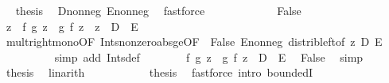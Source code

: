\begin{isabellebody}
\ \isamarkupfalse%
\ {\isacharquery}{\kern0pt}thesis\ \isamarkupfalse%
\ D{\isacharunderscore}{\kern0pt}nonneg\ E{\isacharunderscore}{\kern0pt}nonneg\ \isamarkupfalse%
\ fastforce\isanewline
\ \ \ \ \isamarkupfalse%
\isanewline
\ \ \ \ \ \ \isamarkupfalse%
\ False\isanewline
\ \ \ \ \ \ \isamarkupfalse%
\ {\isachardoublequoteopen}{\isasymbar}z{\isasymbar}\ {\isacharasterisk}{\kern0pt}\ {\isasymbar}f\ {\isacharparenleft}{\kern0pt}g\ z{\isacharparenright}{\kern0pt}\ {\isacharminus}{\kern0pt}\ g\ {\isacharparenleft}{\kern0pt}f\ z{\isacharparenright}{\kern0pt}{\isasymbar}\ {\isasymle}\ {\isasymbar}z{\isasymbar}\ {\isacharasterisk}{\kern0pt}\ {\isacharparenleft}{\kern0pt}D\ {\isacharplus}{\kern0pt}\ E{\isacharparenright}{\kern0pt}{\isachardoublequoteclose}\ \isanewline
\ \ \ \ \ \ \ \ \isamarkupfalse%
\ mult{\isacharunderscore}{\kern0pt}right{\isacharunderscore}{\kern0pt}mono{\isacharbrackleft}{\kern0pt}OF\ Ints{\isacharunderscore}{\kern0pt}nonzero{\isacharunderscore}{\kern0pt}abs{\isacharunderscore}{\kern0pt}ge{}{\isacharbrackleft}{\kern0pt}OF\ {\isacharunderscore}{\kern0pt}\ False{\isacharbrackright}{\kern0pt}\ E{\isacharunderscore}{\kern0pt}nonneg{\isacharbrackright}{\kern0pt}\ distrib{\isacharunderscore}{\kern0pt}left{\isacharbrackleft}{\kern0pt}of\ {\isachardoublequoteopen}{\isasymbar}z{\isasymbar}{\isachardoublequoteclose}\ D\ E{\isacharbrackright}{\kern0pt}\ {\isacharasterisk}{\kern0pt}\isanewline
\ \ \ \ \ \ \ \ \isamarkupfalse%
\ {\isacharparenleft}{\kern0pt}simp\ add{\isacharcolon}{\kern0pt}\ Ints{\isacharunderscore}{\kern0pt}def{\isacharparenright}{\kern0pt}\isanewline
\ \ \ \ \ \ \isamarkupfalse%
\ {\isachardoublequoteopen}{\isasymbar}f\ {\isacharparenleft}{\kern0pt}g\ z{\isacharparenright}{\kern0pt}\ {\isacharminus}{\kern0pt}\ g\ {\isacharparenleft}{\kern0pt}f\ z{\isacharparenright}{\kern0pt}{\isasymbar}\ {\isasymle}\ D\ {\isacharplus}{\kern0pt}\ E{\isachardoublequoteclose}\ \isamarkupfalse%
\ False\ \isamarkupfalse%
\ simp\isanewline
\ \ \ \ \ \ \isamarkupfalse%
\ {\isacharquery}{\kern0pt}thesis\ \isamarkupfalse%
\ linarith\isanewline
\ \ \ \ \isamarkupfalse%
\isanewline
\ \ \isacommand{{\isacharbraceright}{\kern0pt}}\isamarkupfalse%
\isanewline
\ \ \isamarkupfalse%
\ {\isacharquery}{\kern0pt}thesis\ \isamarkupfalse%
\ {\isacharparenleft}{\kern0pt}fastforce\ intro{\isacharcolon}{\kern0pt}\ boundedI{\isacharparenright}{\kern0pt}\isanewline

\end{isabellebody}
